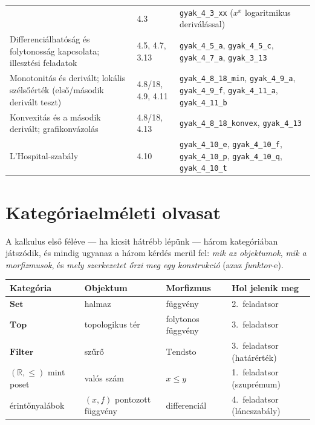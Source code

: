 \documentclass[11pt,a4paper]{article}
\newcommand{\lean}[1]{\texttt{\small #1}}
\newcommand{\R}{\mathbb{R}}
\theoremstyle{definition}
\begin{document}
\begin{longtable}{@{}p{4.4cm}p{3.0cm}p{7.4cm}@{}}
  & 4.3
  & \lean{gyak\_4\_3\_xx} ($x^x$ logaritmikus deriválással) \\
\addlinespace
Differenciálhatóság és folytonosság kapcsolata; illesztési feladatok
  & 4.5, 4.7, 3.13
  & \lean{gyak\_4\_5\_a}, \lean{gyak\_4\_5\_c}, \lean{gyak\_4\_7\_a},
    \lean{gyak\_3\_13} \\
\addlinespace
Monotonitás és derivált; lokális szélsőérték (első/második derivált teszt)
  & 4.8/18, 4.9, 4.11
  & \lean{gyak\_4\_8\_18\_min}, \lean{gyak\_4\_9\_a}, \lean{gyak\_4\_9\_f},
    \lean{gyak\_4\_11\_a}, \lean{gyak\_4\_11\_b} \\
\addlinespace
Konvexitás és a második derivált; grafikonvázolás
  & 4.8/18, 4.13
  & \lean{gyak\_4\_8\_18\_konvex}, \lean{gyak\_4\_13} \\
\addlinespace
L'Hospital-szabály
  & 4.10
  & \lean{gyak\_4\_10\_e}, \lean{gyak\_4\_10\_f}, \lean{gyak\_4\_10\_p},
    \lean{gyak\_4\_10\_q}, \lean{gyak\_4\_10\_t} \\
\end{longtable}
\endgroup

\section{Kategóriaelméleti olvasat}

A kalkulus első féléve --- ha kicsit hátrébb lépünk --- három kategóriában
játszódik, és mindig ugyanaz a három kérdés merül fel: \emph{mik az objektumok},
\emph{mik a morfizmusok}, és \emph{mely szerkezetet őrzi meg egy konstrukció}
(azaz \emph{funktor}-e).

\begin{center}
\begin{tabular}{@{}llll@{}}
\toprule
Kategória & Objektum & Morfizmus & Hol jelenik meg \\
\midrule
$\mathbf{Set}$ & halmaz & függvény & 2.~feladatsor \\
$\mathbf{Top}$ & topologikus tér & folytonos függvény & 3.~feladatsor \\
$\mathbf{Filter}$ & szűrő & $\mathrm{Tendsto}$ & 3.~feladatsor (határérték) \\
$(\R,\le)$ mint poset & valós szám & $x \le y$ & 1.~feladatsor (szuprémum) \\
érintőnyalábok & $(x, f)$ pontozott függvény & differenciál & 4.~feladatsor (láncszabály) \\
\bottomrule
\end{tabular}
\end{center}
\end{document}
